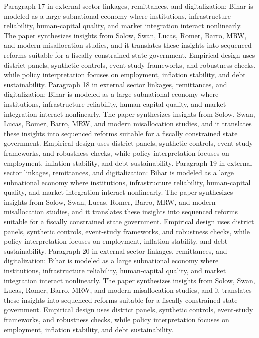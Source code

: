 \documentclass[preprint,12pt]{elsarticle}
\begin{document}
Paragraph 17 in external sector linkages, remittances, and digitalization: Bihar is modeled as a large subnational economy where institutions, infrastructure reliability, human-capital quality, and market integration interact nonlinearly. The paper synthesizes insights from Solow, Swan, Lucas, Romer, Barro, MRW, and modern misallocation studies, and it translates these insights into sequenced reforms suitable for a fiscally constrained state government. Empirical design uses district panels, synthetic controls, event-study frameworks, and robustness checks, while policy interpretation focuses on employment, inflation stability, and debt sustainability.
Paragraph 18 in external sector linkages, remittances, and digitalization: Bihar is modeled as a large subnational economy where institutions, infrastructure reliability, human-capital quality, and market integration interact nonlinearly. The paper synthesizes insights from Solow, Swan, Lucas, Romer, Barro, MRW, and modern misallocation studies, and it translates these insights into sequenced reforms suitable for a fiscally constrained state government. Empirical design uses district panels, synthetic controls, event-study frameworks, and robustness checks, while policy interpretation focuses on employment, inflation stability, and debt sustainability.
Paragraph 19 in external sector linkages, remittances, and digitalization: Bihar is modeled as a large subnational economy where institutions, infrastructure reliability, human-capital quality, and market integration interact nonlinearly. The paper synthesizes insights from Solow, Swan, Lucas, Romer, Barro, MRW, and modern misallocation studies, and it translates these insights into sequenced reforms suitable for a fiscally constrained state government. Empirical design uses district panels, synthetic controls, event-study frameworks, and robustness checks, while policy interpretation focuses on employment, inflation stability, and debt sustainability.
Paragraph 20 in external sector linkages, remittances, and digitalization: Bihar is modeled as a large subnational economy where institutions, infrastructure reliability, human-capital quality, and market integration interact nonlinearly. The paper synthesizes insights from Solow, Swan, Lucas, Romer, Barro, MRW, and modern misallocation studies, and it translates these insights into sequenced reforms suitable for a fiscally constrained state government. Empirical design uses district panels, synthetic controls, event-study frameworks, and robustness checks, while policy interpretation focuses on employment, inflation stability, and debt sustainability.
\end{document}
